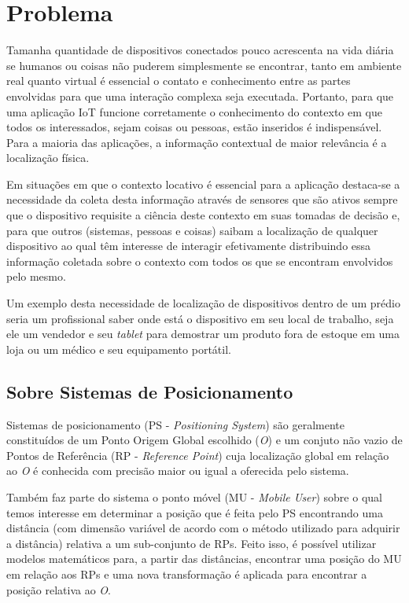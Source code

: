 \section{Problema}
\label{sec:Problema}

Tamanha quantidade de dispositivos conectados pouco acrescenta na vida diária se
humanos ou coisas não puderem simplesmente se encontrar, tanto em ambiente real
quanto virtual é essencial o contato e conhecimento entre as partes envolvidas
para que uma interação complexa seja executada. Portanto, para que uma aplicação
IoT funcione corretamente o conhecimento do contexto em que todos os
interessados, sejam coisas ou pessoas, estão inseridos é indispensável. Para a
maioria das aplicações, a informação contextual de maior relevância é a
localização física.

Em situações em que o contexto locativo é essencial para a aplicação destaca-se
a necessidade da coleta desta informação através de sensores que são ativos
sempre que o dispositivo requisite a ciência deste contexto em suas tomadas de
decisão e, para que outros (sistemas, pessoas e coisas) saibam a localização de
qualquer dispositivo ao qual têm interesse de interagir efetivamente
distribuindo essa informação coletada sobre o contexto com todos os que se
encontram envolvidos pelo mesmo.

Um exemplo desta necessidade de localização de dispositivos dentro de um prédio
seria um profissional saber onde está o dispositivo em seu local de trabalho,
seja ele um vendedor e seu \emph{tablet} para demostrar um produto fora de
estoque em uma loja ou um médico e seu equipamento portátil.

\subsection{Sobre Sistemas de Posicionamento}
\label{subsec:Sobre Sistemas de Posicionamento}

Sistemas de posicionamento (PS - \emph{Positioning System}) são geralmente
constituídos de um Ponto Origem Global escolhido (\emph{O}) e um conjuto não
vazio de Pontos de Referência (RP - \emph{Reference Point}) cuja localização
global em relação ao \emph{O} é conhecida com precisão maior ou igual a
oferecida pelo sistema.

Também faz parte do sistema o ponto móvel (MU - \emph{Mobile User}) sobre o
qual temos interesse em determinar a posição que é feita pelo PS encontrando uma
distância (com dimensão variável de acordo com o método utilizado para adquirir
a distância) relativa a um sub-conjunto de RPs. Feito isso, é possível utilizar
modelos matemáticos para, a partir das distâncias, encontrar uma posição do MU
em relação aos RPs e uma nova transformação é aplicada para encontrar a posição
relativa ao \emph{O}.

